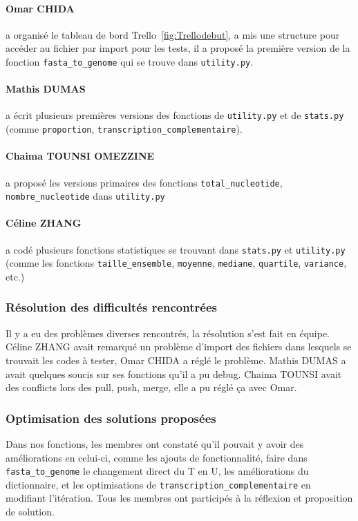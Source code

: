 \paragraph*{Omar CHIDA} a organisé le tableau de bord Trello~\ref{fig:Trellodebut}, a mis une structure pour accéder au fichier par import pour les tests, il a proposé la première version de la fonction \texttt{fasta\_to\_genome} qui se trouve dans \texttt{utility.py}. %

\paragraph*{Mathis DUMAS} a écrit plusieurs premières versions des fonctions de \texttt{utility.py} et de \texttt{stats.py} (comme \texttt{proportion}, \texttt{transcription\_complementaire}).

\paragraph*{Chaima TOUNSI OMEZZINE} a proposé les versions primaires des fonctions \texttt{total\_nucleotide}, \texttt{nombre\_nucleotide} dans \texttt{utility.py}

\paragraph*{Céline ZHANG} a codé plusieurs fonctions statistiques se trouvant dans \texttt{stats.py} et \texttt{utility.py} (comme les fonctions \texttt{taille\_ensemble}, \texttt{moyenne}, \texttt{mediane}, \texttt{quartile}, \texttt{variance}, etc.)

\subsubsection*{Résolution des difficultés rencontrées}
Il y a eu des problèmes diverses rencontrés, la résolution s'est fait en équipe. Céline ZHANG avait remarqué un problème d'import des fichiers dans lesquels se trouvait les codes à tester, Omar CHIDA a réglé le problème. Mathis DUMAS a avait quelques soucis sur ses fonctions qu'il a pu debug. Chaima TOUNSI avait des conflicts lors des pull, push, merge, elle a pu réglé ça avec Omar.

\subsubsection*{Optimisation des solutions proposées}
Dans nos fonctions, les membres ont constaté qu'il pouvait y avoir des améliorations en celui-ci, comme les ajouts de fonctionnalité, faire dans \texttt{fasta\_to\_genome} le changement direct du T en U, les améliorations du dictionnaire, et les optimisations de \texttt{transcription\_complementaire} en modifiant l'itération. Tous les membres ont participés à la réflexion et proposition de solution.

